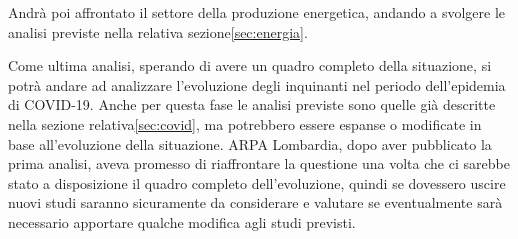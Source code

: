 \documentclass{article}
\begin{document}
Andrà poi affrontato il settore della produzione energetica, andando a svolgere le analisi previste nella relativa sezione\ref{sec:energia}.

Come ultima analisi, sperando di avere un quadro completo della situazione, si potrà andare ad analizzare l'evoluzione degli inquinanti nel periodo dell'epidemia di COVID-19. Anche per questa fase le analisi previste sono quelle già descritte nella sezione relativa\ref{sec:covid}, ma potrebbero essere espanse o modificate in base all'evoluzione della situazione. ARPA Lombardia, dopo aver pubblicato la prima analisi\cite{arpaCovid}, aveva promesso di riaffrontare la questione una volta che ci sarebbe stato a disposizione il quadro completo dell'evoluzione, quindi se dovessero uscire nuovi studi saranno sicuramente da considerare e valutare se eventualmente sarà necessario apportare qualche modifica agli studi previsti. 
 

%
%
\label{bib-begin}
\printbibliography
\end{document}
